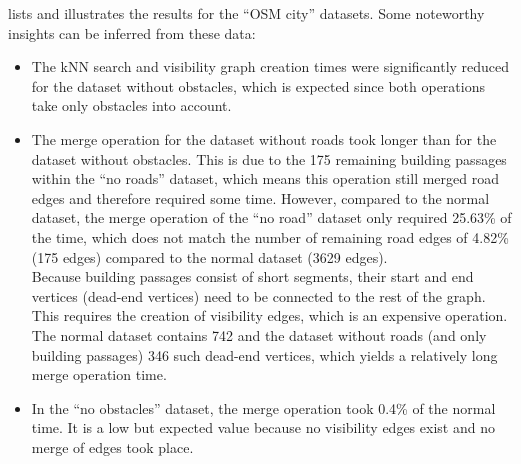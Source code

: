 			\noindent
			 lists and illustrates the results for the \enquote{OSM city} datasets.
			Some noteworthy insights can be inferred from these data:
			\begin{itemize}
				\item The kNN search and visibility graph creation times were significantly reduced for the dataset without obstacles, which is expected since both operations take only obstacles into account.
				\item The merge operation for the dataset without roads took longer than for the dataset without obstacles.
				This is due to the 175 remaining building passages within the \enquote{no roads} dataset, which means this operation still merged road edges and therefore required some time.
				However, compared to the normal dataset, the merge operation of the \enquote{no road} dataset only required 25.63\% of the time, which does not match the number of remaining road edges of 4.82\% (175 edges) compared to the normal dataset (3629 edges).\\
				Because building passages consist of short segments, their start and end vertices (dead-end vertices) need to be connected to the rest of the graph.
				This requires the creation of visibility edges, which is an expensive operation.
				The normal dataset contains 742 and the dataset without roads (and only building passages) 346 such dead-end vertices, which yields a relatively long merge operation time.
				\item In the \enquote{no obstacles} dataset, the merge operation took 0.4\% of the normal time. It is a low but expected value because no visibility edges exist and no merge of edges took place.
			\end{itemize}
			
